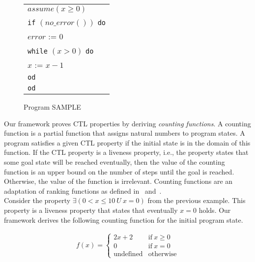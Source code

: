\documentclass[11pt,a4paper,titlepage]{article}
\theoremstyle{definition}
\begin{document}
\begin{figure}
    \begin{center}
        \begin{tabular}{l}
            $assume(x \geq 0)$ \\
            \texttt{if} $(no\_error())$ \texttt{do} \\
            \hspace{1em}$error$ := $0$ \\
            \hspace{1em}\texttt{while} $(x > 0)$ \texttt{do} \\
            \hspace{2em}$x$ := $x - 1$ \\
            \hspace{1em}\texttt{od}\\
            \texttt{od}
        \end{tabular}
    \end{center}
    \vspace{-1em}
    \caption{Program \textsf{SAMPLE}}
    \label{fig:introduction_sample}
\end{figure}

Our framework proves CTL properties by deriving \emph{counting functions}. A counting function is a partial function that assigns 
natural numbers to program states. A program satisfies a given CTL property if the initial state is in the domain of this function. 
If the CTL property is a liveness property, i.e., the property states that some goal state will be reached eventually, 
then the value of the counting function is an upper bound on the number of steps until the goal is reached. 
Otherwise, the value of the function is irrelevant. Counting functions are an adaptation of ranking functions 
as defined in~\cite{CousotCousot-POPL12} and~\cite{UrbanM-VMCAI15}.\\

Consider the property 
$\exists(0 < x \leq 10 \ U \ x = 0)$ from the previous example. This property is a liveness property that states that eventually $x = 0$ holds.
Our framework derives the following counting function for the initial program state.

\begin{align*}
f(x) = \begin{cases}
    2x + 2 & \text{if} \ x \geq 0 \\
    0 & \text{if} \ x = 0 \\
    \text{undefined}    & \text{otherwise}
\end{cases}
\end{align*}
\end{document}
